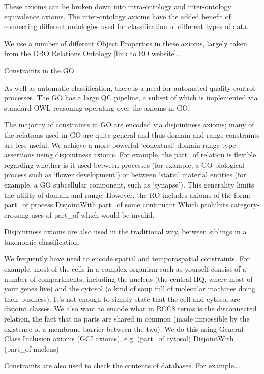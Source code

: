 \documentclass{llncs}
\begin{document}
These axioms can be broken down into intra-ontology and inter-ontology equivalence axioms. The inter-ontology axioms have the added benefit of connecting different ontologies used for classification of different types of data.

We use a number of different Object Properties in these axioms, largely taken from the OBO Relations Ontology [link to RO website].

Constraints in the GO

As well as automatic classification, there is a need for automated quality control processes. The GO has a large QC pipeline, a subset of which is implemented via standard OWL reasoning operating over the axioms in GO.

The majority of constraints in GO are encoded via disjointness axioms; many of the relations used in GO are quite general and thus domain and range constraints are less useful. We achieve a more powerful ‘conextual’ domain-range type assertions using disjointness axioms. For example, the part\_of relation is flexible regarding whether is it used between processes (for example, a GO biological process such as ‘flower development’) or between ‘static’ material entities (for example, a GO subcellular component, such as ‘synapse’). This generality limits the utility of domain and range. However, the RO includes axioms of the form:
    part\_of process DisjointWith part\_of some continuant
Which prohibits category-crossing uses of part\_of which would be invalid.

Disjointness axioms are also used in the traditional way, between siblings in a taxonomic classification.

We frequently have need to encode spatial and temporospatial constraints. For example, most of the cells in a complex organism such as yourself consist of a number of compartments, including the nucleus (the central HQ, where most of your genes live) and the cytosol (a kind of soup full of molecular machines doing their business). It’s not enough to simply state that the cell and cytosol are disjoint classes. We also want to encode what in RCC8 terms is the disconnected relation, the fact that no parts are shared in common (made impossible by the existence of a membrane barrier between the two). We do this using General Class Inclusion axioms (GCI axioms), e.g.
     (part\_of cytosol) DisjointWith (part\_of nucleus)

Constraints are also used to check the contents of databases. For example…..
\end{document}
